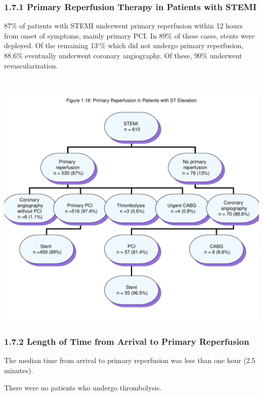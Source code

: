 \documentclass[
]{article}
\begin{document}
\subsubsection{1.7.1 Primary Reperfusion Therapy in Patients with
STEMI}\label{primary-reperfusion-therapy-in-patients-with-stemi}

87\% of patients with STEMI underwent primary reperfusion within 12
hours from onset of symptoms, mainly primary PCI. In 89\% of these
cases, stents were deployed. Of the remaining 13`\% which did not
undergo primary reperfusion, 88.6\% eventually underwent coronary
angiography. Of these, 90\% underwent revascularization.

~

\includegraphics{‏‏ACSIS_2024_v1_with_trend_pdf_files/figure-latex/unnamed-chunk-58-1.pdf}

\pagebreak

\subsubsection{1.7.2 Length of Time from Arrival to Primary
Reperfusion}\label{length-of-time-from-arrival-to-primary-reperfusion}

The median time from arrival to primary reperfusion was less than one
hour (2.5 minutes).

There were no patients who undergo thrombolysis. ~
\end{document}
